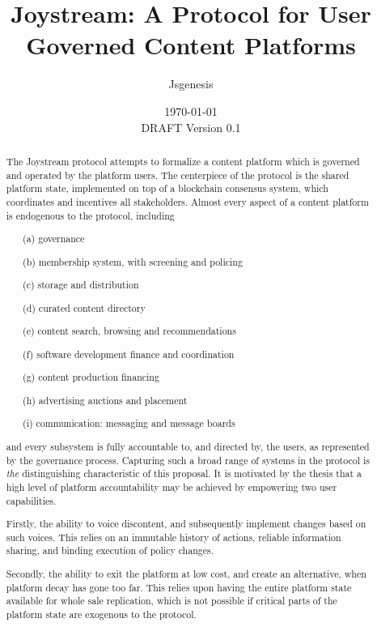 \documentclass{article}
\begin{document}
%
\title{
\textbf{
Joystream: A Protocol for User Governed Content Platforms
}
}
%
%

\author{Jsgenesis}

\date{\today \\ DRAFT Version 0.1}

\maketitle              %


%
\begin{abstract}

The Joystream protocol attempts to formalize a  content platform which is governed and operated by the platform users. The centerpiece of the protocol is the shared platform state, implemented on top of a blockchain consensus system, which coordinates and incentives all stakeholders. Almost every aspect of a content platform is endogenous to the protocol, including

    \begin{itemize}
        \item[(a)] {governance}
        \item[(b)] {membership system, with screening and policing}
        \item[(c)] {storage and distribution}
        \item[(d)] {curated content directory}
        \item[(e)] {content search, browsing and recommendations}
        \item[(f)] {software development finance and coordination}
        \item[(g)] {content production financing}
        \item[(h)] {advertising auctions and placement}
        \item[(i)] {communication: messaging and message boards}
    \end{itemize}

and every subsystem is fully accountable to, and directed by, the users, as represented by the governance process. Capturing such a broad range of systems in the protocol is \textit{the} distinguishing characteristic of this proposal. It is motivated by the thesis that a high level of platform accountability may be achieved by empowering two user capabilities.

Firstly, the ability to voice discontent, and subsequently implement changes based on such voices. This relies on an immutable history of actions, reliable information sharing, and binding execution of policy changes.

Secondly, the ability to exit the platform at low cost, and create an alternative, when platform decay has gone too far. This relies upon having the entire platform state available for whole sale replication, which is not possible if critical parts of the platform state are exogenous to the protocol.

\end{abstract}
\end{document}
